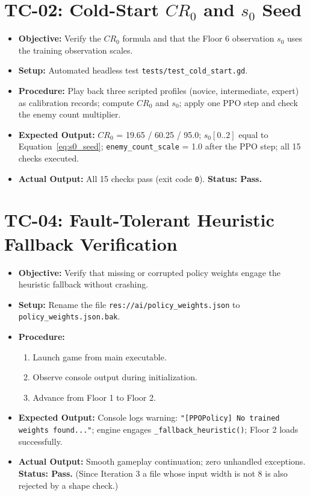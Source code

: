 \section{TC-02: Cold-Start $CR_0$ and $s_0$ Seed}
\begin{itemize}
    \item \textbf{Objective:} Verify the $CR_0$ formula and that the Floor 6 observation $s_0$ uses the training observation scales.
    \item \textbf{Setup:} Automated headless test \texttt{tests/test\_cold\_start.gd}.
    \item \textbf{Procedure:} Play back three scripted profiles (novice, intermediate, expert) as calibration records; compute $CR_0$ and $s_0$; apply one PPO step and check the enemy count multiplier.
    \item \textbf{Expected Output:} $CR_0$ = 19.65 / 60.25 / 95.0; $s_0[0..2]$ equal to Equation~\ref{eq:s0_seed}; \texttt{enemy\_count\_scale} = 1.0 after the PPO step; all 15 checks executed.
    \item \textbf{Actual Output:} All 15 checks pass (exit code \texttt{0}). \textbf{Status: Pass.}
\end{itemize}

\section{TC-04: Fault-Tolerant Heuristic Fallback Verification}
\begin{itemize}
    \item \textbf{Objective:} Verify that missing or corrupted policy weights engage the heuristic fallback without crashing.
    \item \textbf{Setup:} Rename the file \texttt{res://ai/\allowbreak policy\_\allowbreak weights.json} to \texttt{policy\_\allowbreak weights.json.bak}.
    \item \textbf{Procedure:}
    \begin{enumerate}
        \item Launch game from main executable.
        \item Observe console output during initialization.
        \item Advance from Floor 1 to Floor 2.
    \end{enumerate}
    \item \textbf{Expected Output:} Console logs warning: \texttt{"[PPOPolicy] No trained weights found..."}; engine engages \texttt{\_fallback\_heuristic()}; Floor 2 loads successfully.
    \item \textbf{Actual Output:} Smooth gameplay continuation; zero unhandled exceptions. \textbf{Status: Pass.} (Since Iteration 3 a file whose input width is not 8 is also rejected by a shape check.)
\end{itemize}


